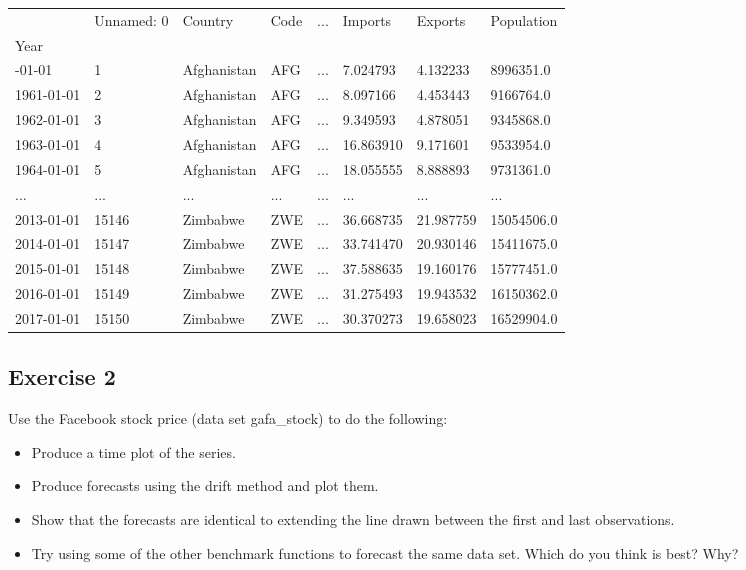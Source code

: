 \documentclass[
  11pt,
]{article}
\begin{document}
\begin{longtable}[]{@{}llllllll@{}}
\toprule\noalign{}
& Unnamed: 0 & Country & Code & ... & Imports & Exports & Population \\
Year & & & & & & & \\
\midrule\noalign{}
\endhead
\bottomrule\noalign{}
\endlastfoot
1960-01-01 & 1 & Afghanistan & AFG & ... & 7.024793 & 4.132233 &
8996351.0 \\
1961-01-01 & 2 & Afghanistan & AFG & ... & 8.097166 & 4.453443 &
9166764.0 \\
1962-01-01 & 3 & Afghanistan & AFG & ... & 9.349593 & 4.878051 &
9345868.0 \\
1963-01-01 & 4 & Afghanistan & AFG & ... & 16.863910 & 9.171601 &
9533954.0 \\
1964-01-01 & 5 & Afghanistan & AFG & ... & 18.055555 & 8.888893 &
9731361.0 \\
... & ... & ... & ... & ... & ... & ... & ... \\
2013-01-01 & 15146 & Zimbabwe & ZWE & ... & 36.668735 & 21.987759 &
15054506.0 \\
2014-01-01 & 15147 & Zimbabwe & ZWE & ... & 33.741470 & 20.930146 &
15411675.0 \\
2015-01-01 & 15148 & Zimbabwe & ZWE & ... & 37.588635 & 19.160176 &
15777451.0 \\
2016-01-01 & 15149 & Zimbabwe & ZWE & ... & 31.275493 & 19.943532 &
16150362.0 \\
2017-01-01 & 15150 & Zimbabwe & ZWE & ... & 30.370273 & 19.658023 &
16529904.0 \\
\end{longtable}

\subsection{Exercise 2}\label{exercise-2}

Use the Facebook stock price (data set gafa\_stock) to do the following:

\begin{itemize}
\item
  Produce a time plot of the series.
\item
  Produce forecasts using the drift method and plot them.
\item
  Show that the forecasts are identical to extending the line drawn
  between the first and last observations.
\item
  Try using some of the other benchmark functions to forecast the same
  data set. Which do you think is best? Why?
\end{itemize}
\end{document}
